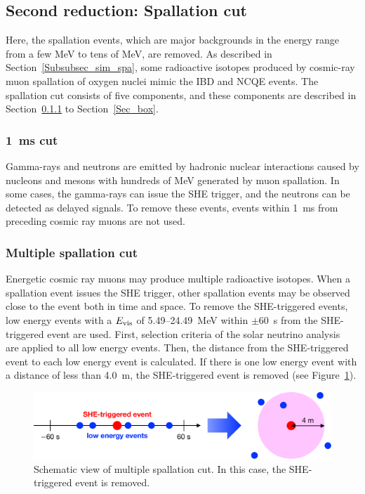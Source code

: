 \subsection{Second reduction: Spallation cut}
\vs\hs
Here, the spallation events, which are major backgrounds in the energy range from a few MeV to tens of MeV, are removed.
As described in Section~\ref{Subsubsec_sim_spa}, some radioactive isotopes produced by cosmic-ray muon spallation of oxygen nuclei mimic the IBD and NCQE events.
The spallation cut consists of five components, and these components are described in Section~\ref{Sec_1ms} to Section~\ref{Sec_box}.

\subsubsection{1~ms cut}\label{Sec_1ms}
\vs\hs
Gamma-rays and neutrons are emitted by hadronic nuclear interactions caused by nucleons and mesons with hundreds of MeV generated by muon spallation.
In some cases, the gamma-rays can issue the SHE trigger, and the neutrons can be detected as delayed signals.
To remove these events, events within 1~ms from preceding cosmic ray muons are not used.

\subsubsection{Multiple spallation cut}
\vs\hs
Energetic cosmic ray muons may produce multiple radioactive isotopes.
When a spallation event issues the SHE trigger, other spallation events may be observed close to the event both in time and space.
To remove the SHE-triggered events, low energy events with a $E_{\rm vis}$ of 5.49--24.49~MeV within $\pm$60~s from the SHE-triggered event are used.
First, selection criteria of the solar neutrino analysis~\cite{2016Abe} are applied to all low energy events.
Then, the distance from the SHE-triggered event to each low energy event is calculated.
If there is one low energy event with a distance of less than 4.0~m, the SHE-triggered event is removed (see Figure~\ref{Selection_multiple_spa}).

\begin{figure}[h]
	\centering
	\includegraphics[width=12cm]{Figures/Selection/multiple_spa}
	\caption[Schematic view of multiple spallation cut]{
	Schematic view of multiple spallation cut.
	In this case, the SHE-triggered event is removed.
	}\label{Selection_multiple_spa}
\end{figure}

